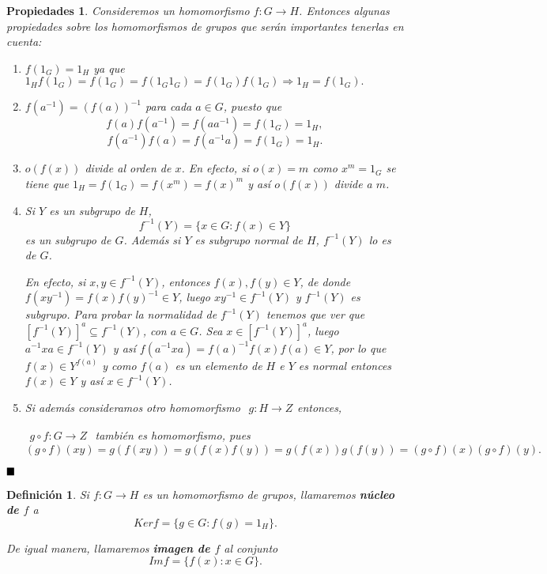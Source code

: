 \documentclass[12pt]{article}
\newtheorem{definition}[theorem]{Definición}
\newtheorem{properties}{Propiedades}[theorem]
\begin{document}
\begin{properties}\label{eq:propHoms} Consideremos un homomorfismo $f \colon G \longrightarrow H$. Entonces algunas propiedades sobre los homomorfismos de grupos que serán importantes tenerlas en cuenta:
\begin{enumerate}
\item $f(1_{G}) = 1_{H}$ ya que $1_{H}f(1_{G}) = f(1_{G}) = f(1_{G}1_{G}) = f(1_{G})f(1_{G}) \Longrightarrow 1_{H} = f(1_{G}).$
\item $f(a^{-1}) = (f(a))^{-1}$ para cada $a \in G$, puesto que $$f(a)f(a^{-1}) = f(aa^{-1}) = f(1_{G}) = 1_{H},$$ $$f(a^{-1})f(a) = f(a^{-1}a) = f(1_{G}) = 1_{H}.$$
\item $o(f(x))$ divide al orden de $x$. En efecto, si $o(x) = m$ como $x^{m} = 1_{G}$ se tiene que $1_{H} = f(1_{G}) = f(x^{m}) = f(x)^{m}$ y así $o(f(x))$ divide a $m$. 
\item Si $Y$ es un subgrupo de $H$, $$f^{-1}(Y) = \lbrace x \in G : f(x) \in Y\rbrace$$ es un subgrupo de $G$. Además si $Y$ es subgrupo normal de $H$, $f^{-1}(Y)$ lo es de $G$.

En efecto, si $x,y \in f^{-1}(Y)$, entonces $f(x),f(y) \in Y$, de donde $f(xy^{-1}) = f(x)f(y)^{-1} \in Y$, luego $xy^{-1} \in f^{-1}(Y)$ y $f^{-1}(Y)$ es subgrupo. Para probar la normalidad de $f^{-1}(Y)$ tenemos que ver que $[f^{-1}(Y)]^a \subseteq f^{-1}(Y)$, con $a \in G$. Sea $x \in [f^{-1}(Y)]^a$, luego $a^{-1}xa \in f^{-1}(Y)$ y así $f(a^{-1}xa)=f(a)^{-1}f(x)f(a) \in Y$, por lo que $f(x) \in Y^{f(a)}$ y como $f(a)$ es un elemento de $H$ e $Y$ es normal entonces $f(x) \in Y$ y así $x \in f^{-1}(Y)$.
 
\item Si además consideramos otro homomorfismo $
\begin{array}{rccl}
g\colon H \longrightarrow  Z
\end{array}
$entonces,

$\begin{array}{rccl}
g \circ f\colon G \longrightarrow  Z
\end{array}
$ también es homomorfismo, pues $$ (g \circ f)(xy) = g(f(xy)) = g(f(x)f(y)) = g(f(x))g(f(y)) = (g \circ f)(x) (g \circ f)(y).$$
\end{enumerate}
\end{properties}
$\hfill \blacksquare$

\begin{definition}Si $f \colon G \longrightarrow H$ es un homomorfismo de grupos, llamaremos \textbf{núcleo de $f$} a $$Ker f= \lbrace g \in G: f(g) = 1_H \rbrace.$$

De igual manera, llamaremos \textbf{imagen de $f$} al conjunto $$Im f = \lbrace f(x) : x \in G\rbrace.$$
\end{definition}
\end{document}
